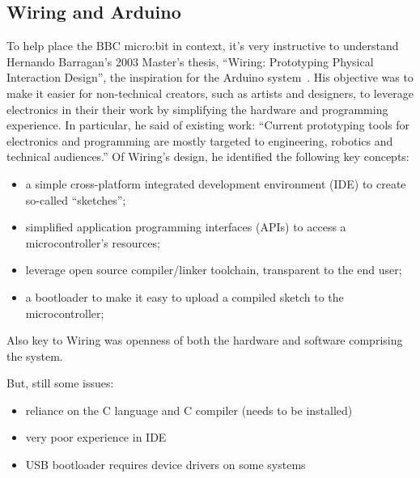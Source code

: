 \subsection{Wiring and Arduino}




To help place the BBC micro:bit in context, it's very instructive to understand
Hernando Barragan's 2003 Master's thesis, ``Wiring: Prototyping Physical Interaction Design'',
the inspiration for the Arduino system~\cite{Barragan}. His objective was to make it easier
for non-technical creators, such as artists and designers, to leverage
electronics in their their work by simplifying the hardware and programming
experience. In particular, he said of existing work:
``Current prototyping tools for electronics and programming are mostly targeted 
to engineering, robotics and technical audiences.''  
Of Wiring's design, he identified the following key concepts:
\begin{itemize}
\item a simple cross-platform integrated development environment (IDE) to create so-called ``sketches'';
\item simplified application programming interfaces (APIs) to access a microcontroller's resources;
\item leverage open source compiler/linker toolchain, transparent to the end user;
\item a bootloader to make it easy to upload a compiled sketch to the microcontroller;
\end{itemize}
Also key to Wiring was openness of both the hardware and software
comprising the system.

But, still some issues:
\begin{itemize}
    \item reliance on the C language and C compiler (needs to be installed)
    \item very poor experience in IDE
    \item USB bootloader requires device drivers on some systems 
\end{itemize}

